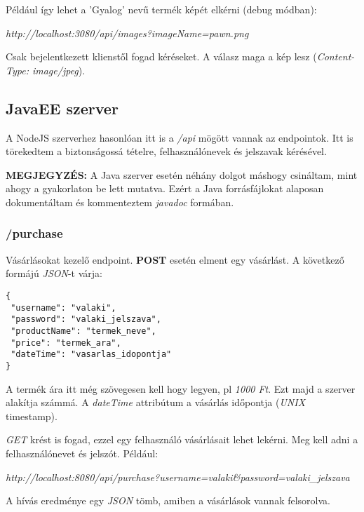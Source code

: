 \documentclass[]{article}
\begin{document}
Például így lehet a 'Gyalog' nevű termék képét elkérni (debug módban):

\bigskip
\begin{center}
	\textit{http://localhost:3080/api/images?imageName=pawn.png}
\end{center}
\bigskip

Csak bejelentkezett klienstől fogad kéréseket. A válasz maga a kép lesz (\textit{Content-Type: image/jpeg}). 

\subsection{JavaEE szerver}\label{javaee}

A NodeJS szerverhez hasonlóan itt is a \textit{/api} mögött vannak az endpointok. Itt is törekedtem a biztonságossá tételre, felhasználónevek és jelszavak kérésével.

\textbf{MEGJEGYZÉS:} A Java szerver esetén néhány dolgot máshogy csináltam, mint ahogy a gyakorlaton be lett mutatva. Ezért a 
Java forrásfájlokat alaposan dokumentáltam és kommenteztem \textit{javadoc} formában. 

\subsubsection{/purchase}

Vásárlásokat kezelő endpoint. \textbf{POST} esetén elment egy vásárlást. A következő formájú \textit{JSON}-t várja:

\bigskip
\begin{lstlisting}
{
 "username": "valaki",
 "password": "valaki_jelszava",
 "productName": "termek_neve",
 "price": "termek_ara",
 "dateTime": "vasarlas_idopontja"
}
\end{lstlisting}

A termék ára itt még szövegesen kell hogy legyen, pl \textit{1000 Ft}. Ezt majd a szerver alakítja számmá. A \textit{dateTime} attribútum a vásárlás időpontja (\textit{UNIX} timestamp).

\textit{GET} krést is fogad, ezzel egy felhasználó vásárlásait lehet lekérni. Meg kell adni a felhasználónevet és jelszót. Például:

\begin{center}
	\textit{http://localhost:8080/api/purchase?username=valaki\&password=valaki\_jelszava}
\end{center}

A hívás eredménye egy \textit{JSON} tömb, amiben a vásárlások vannak felsorolva.
\end{document}
